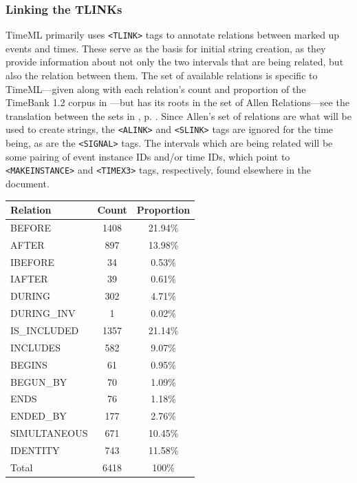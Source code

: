 \documentclass[a4paper,12pt,leqno]{article}
\begin{document}
\subsubsection{Linking the TLINKs}\label{ssub:tlinks}
TimeML primarily uses \verb|<TLINK>| tags to annotate relations between marked up events and times. These serve as the basis for initial string creation, as they provide information about not only the two intervals that are being related, but also the relation between them. The set of available relations is specific to TimeML---given along with each relation's count and proportion of the TimeBank 1.2 corpus in ---but has its roots in the set of Allen Relations---see the translation between the sets in , p. \pageref{fig:tlink-allen-translation}. Since Allen's set of relations are what will be used to create strings, the \verb|<ALINK>| and \verb|<SLINK>| tags are ignored for the time being, as are the \verb|<SIGNAL>| tags. The intervals which are being related will be some pairing of event instance IDs and/or time IDs, which point to \verb|<MAKEINSTANCE>| and \verb|<TIMEX3>| tags, respectively, found elsewhere in the document.
\begin{center}
	\begin{tabular}[h!]{| l c c |}
		\hline
		\textbf{Relation} & \textbf{Count} & \textbf{Proportion}\\
		\hline
		BEFORE & 1408 & 21.94\%\\
		AFTER & 897 & 13.98\%\\
		IBEFORE & 34 & 0.53\%\\
		IAFTER & 39 & 0.61\%\\
		DURING & 302 & 4.71\%\\
		DURING\_INV & 1 & 0.02\%\\
		IS\_INCLUDED & 1357 & 21.14\%\\
		INCLUDES & 582 & 9.07\%\\
		BEGINS & 61 & 0.95\%\\
		BEGUN\_BY & 70 & 1.09\%\\
		ENDS & 76 & 1.18\%\\
		ENDED\_BY & 177 & 2.76\%\\
		SIMULTANEOUS & 671 & 10.45\%\\
		IDENTITY & 743 & 11.58\%\\
		\hline
		Total & 6418 & 100\%\\
		\hline
	\end{tabular}
	\label{tab:timeml-relation-counts}
\end{center}
\end{document}

